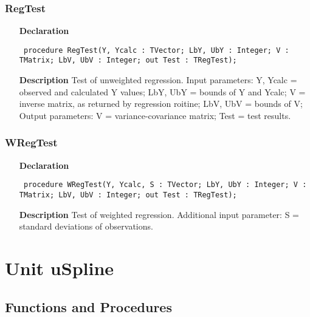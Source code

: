 \documentclass[12pt,a4paper,oneside]{report}
\newcommand{\lmath}[1]{   %
	\marginpar{\vspace{#1} 
		\begin{flushright}
			LMath
	\end{flushright} }
}
\newcommand{\declarationitem}[1]{\textbf{#1}}
\newcommand{\descriptiontitle}[1]{\textbf{#1}}
\newcommand{\code}[1]{\texttt{#1}}
\begin{document}
\subsubsection{RegTest}
\label{uregtest-RegTest}
\begin{itemize}\item[\declarationitem{Declaration}\hfill]
	\begin{flushleft}
		\code{
			procedure RegTest(Y, Ycalc : TVector; LbY, UbY : Integer; V : TMatrix; LbV, UbV : Integer; out Test : TRegTest);}
		
	\end{flushleft}
	
	\par
	\item[\descriptiontitle{Description}]
	Test of unweighted regression. Input parameters: Y, Ycalc = observed and calculated Y values; LbY, UbY = bounds of Y and Ycalc; V = inverse matrix, as returned by regression roitine; LbV, UbV = bounds of V; Output parameters: V = variance-covariance matrix; Test = test results.
	
\end{itemize}
\subsubsection{WRegTest}
\label{uregtest-WRegTest}
\begin{itemize}\item[\declarationitem{Declaration}\hfill]
	\begin{flushleft}
		\code{
			procedure WRegTest(Y, Ycalc, S : TVector; LbY, UbY : Integer; V : TMatrix; LbV, UbV : Integer; out Test : TRegTest);}
		
	\end{flushleft}
	
	\par
	\item[\descriptiontitle{Description}]
	Test of weighted regression. Additional input parameter: S = standard deviations of observations.
	
\end{itemize}
\section{Unit uSpline}\lmath{-24pt}
\label{uSpline}
\subsection{Functions and Procedures}
\end{document}

